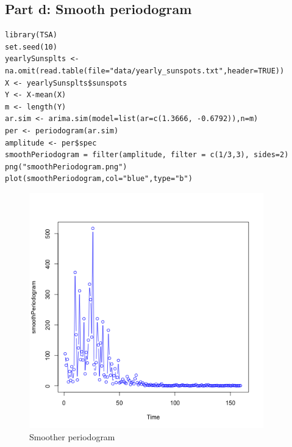 \documentclass[11pt, oneside]{article}   	%
\begin{document}
\subsection{Part d: Smooth periodogram}
 \begin{lstlisting}
library(TSA)
set.seed(10)
yearlySunsplts <- na.omit(read.table(file="data/yearly_sunspots.txt",header=TRUE))
X <- yearlySunsplts$sunspots
Y <- X-mean(X)
m <- length(Y)
ar.sim <- arima.sim(model=list(ar=c(1.3666, -0.6792)),n=m)
per <- periodogram(ar.sim)
amplitude <- per$spec
smoothPeriodogram = filter(amplitude, filter = c(1/3,3), sides=2)
png("smoothPeriodogram.png")
plot(smoothPeriodogram,col="blue",type="b")
 \end{lstlisting}
\begin{figure}[H] %
   \centering
   \includegraphics[width=4in]{smoothPeriodogram.png} 
   \caption{Smoother periodogram}
   \label{fig:per}
\end{figure}
\end{document}
